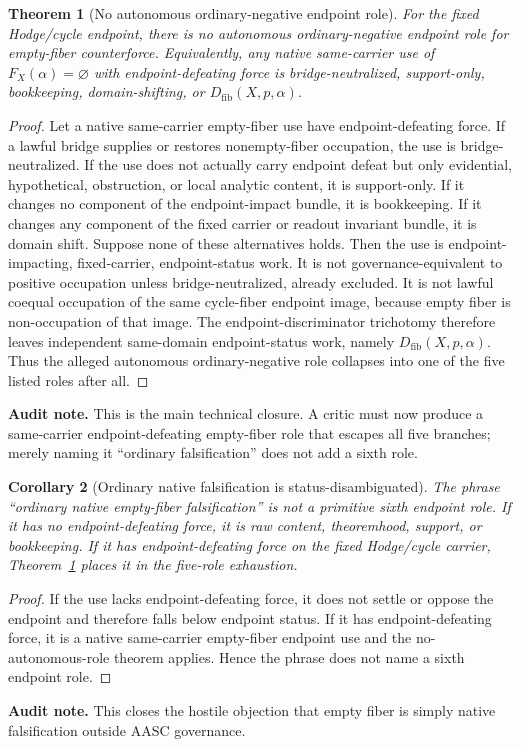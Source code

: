 \documentclass[11pt]{article}
\newtheorem{theorem}{Theorem}[section]
\newtheorem{corollary}[theorem]{Corollary}
\begin{document}
\begin{theorem}[No autonomous ordinary-negative endpoint role]\label{thm:no-autonomous-ordinary-negative-endpoint-role}
For the fixed Hodge/cycle endpoint, there is no autonomous ordinary-negative endpoint role for empty-fiber counterforce. Equivalently, any native same-carrier use of $F_X(\alpha)=\varnothing$ with endpoint-defeating force is bridge-neutralized, support-only, bookkeeping, domain-shifting, or $D_{\mathrm{fib}}(X,p,\alpha)$.
\end{theorem}
\begin{proof}
Let a native same-carrier empty-fiber use have endpoint-defeating force. If a lawful bridge supplies or restores nonempty-fiber occupation, the use is bridge-neutralized. If the use does not actually carry endpoint defeat but only evidential, hypothetical, obstruction, or local analytic content, it is support-only. If it changes no component of the endpoint-impact bundle, it is bookkeeping. If it changes any component of the fixed carrier or readout invariant bundle, it is domain shift. Suppose none of these alternatives holds. Then the use is endpoint-impacting, fixed-carrier, endpoint-status work. It is not governance-equivalent to positive occupation unless bridge-neutralized, already excluded. It is not lawful coequal occupation of the same cycle-fiber endpoint image, because empty fiber is non-occupation of that image. The endpoint-discriminator trichotomy therefore leaves independent same-domain endpoint-status work, namely $D_{\mathrm{fib}}(X,p,\alpha)$. Thus the alleged autonomous ordinary-negative role collapses into one of the five listed roles after all.
\end{proof}
\par\noindent\textbf{Audit note.} This is the main technical closure. A critic must now produce a same-carrier endpoint-defeating empty-fiber role that escapes all five branches; merely naming it ``ordinary falsification'' does not add a sixth role.

\begin{corollary}[Ordinary native falsification is status-disambiguated]
The phrase ``ordinary native empty-fiber falsification'' is not a primitive sixth endpoint role. If it has no endpoint-defeating force, it is raw content, theoremhood, support, or bookkeeping. If it has endpoint-defeating force on the fixed Hodge/cycle carrier, Theorem~\ref{thm:no-autonomous-ordinary-negative-endpoint-role} places it in the five-role exhaustion.
\end{corollary}
\begin{proof}
If the use lacks endpoint-defeating force, it does not settle or oppose the endpoint and therefore falls below endpoint status. If it has endpoint-defeating force, it is a native same-carrier empty-fiber endpoint use and the no-autonomous-role theorem applies. Hence the phrase does not name a sixth endpoint role.
\end{proof}
\par\noindent\textbf{Audit note.} This closes the hostile objection that empty fiber is simply native falsification outside AASC governance.
\end{document}
